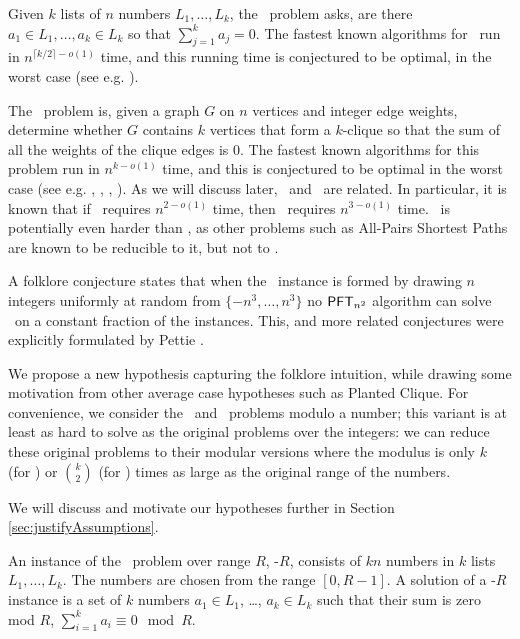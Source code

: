 Given $k$ lists of $n$ numbers $L_1,\ldots,L_k$, the \kSum~problem asks, are there $a_1\in L_1,\ldots, a_k\in L_k$ so that $\sum_{j=1}^k a_j=0$. The fastest known algorithms for \kSum~run in $n^{\lceil k/2\rceil -o(1)}$ time, and this running time is conjectured to be optimal, in the worst case (see e.g. \cite{Patrascu10,AbboudW14pop,icm-survey}). 

The \zkclique~problem is, given a graph $G$ on $n$ vertices and integer edge weights, determine whether $G$ contains $k$ vertices that form a $k$-clique so that the sum of all the weights of the clique edges is $0$. The fastest known algorithms for this problem run in $n^{k-o(1)}$ time, and this is conjectured to be optimal in the worst case (see e.g. \cite{BackursT16}, \cite{abboud2014consequences}, \cite{sparseGraphsLVWW}, \cite{treeEditDistance}). As we will discuss later, \zkclique~and \kSum~are related. In particular, it is known \cite{virgi10} that if \ThSum~requires $n^{2-o(1)}$ time, then \zThclique~requires $n^{3-o(1)}$ time. \zThclique~is potentially even harder than \ThSum, as other problems such as All-Pairs Shortest Paths are known to be reducible to it, but not to \ThSum.


A folklore conjecture states that when the \ThSum~instance is formed by drawing $n$ integers uniformly at random from $\{-n^3, \dots, n^3\}$ no $\mathsf{PFT}_{n^2}$ algorithm can solve \ThSum~on a constant fraction of the instances. 
This, and more related conjectures were explicitly formulated by Pettie \cite{avgCase3Sum}. 

We propose a new hypothesis capturing the folklore intuition, while drawing some motivation from other average case hypotheses such as Planted Clique. For convenience, we consider the \kSum~and \zkclique~problems modulo a number;
this variant is at least as hard to solve as the original problems over the integers: we can reduce these original problems to their modular versions where the modulus is only $k$ (for \kSum) or $\binom k 2$ (for \zkclique) times as large as the original range of the numbers.

We will discuss and motivate our hypotheses further in Section \ref{sec:justifyAssumptions}.

\begin{definition}
	An instance of the \kSum~problem over range $R$, \kSum-$R$, consists of $kn$ numbers in $k$ lists $L_1, \ldots, L_k$. The numbers are chosen from the range $[0,R-1]$. 
	A solution of a \kSum-$R$ instance is a set of $k$ numbers $a_1 \in L_1$, \ldots, $a_k \in L_k$ such that their sum is zero mod $R$, $\sum_{i=1}^k a_i \equiv 0 \mod R$. 
\end{definition}

